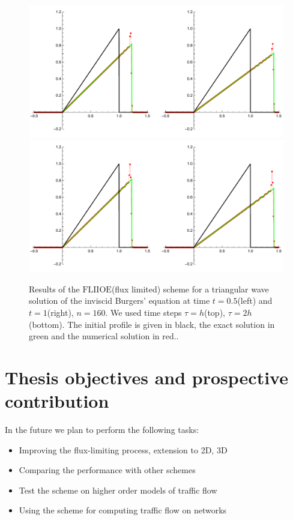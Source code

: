 \documentclass[../include.tex]{subfiles}
\begin{document}
\begin{figure}[H]
	\centering
	\includegraphics[width=\textwidth]{figures/inviscidTriang160c1}
	\includegraphics[width=\textwidth]{figures/inviscidTriang160c2}
	\caption{Results of the $\mathrm{FLIIOE}$(flux limited) scheme for a triangular wave solution of the inviscid Burgers' equation at time $ t=0.5 $(left) and $ t=1 $(right), $ n=160 $. We used time steps $ \tau=h $(top), $ \tau=2h $(bottom). The initial profile is given in black, the exact solution in green and the numerical solution in red..}
	\label{fig:fliioe_burg_triang}
\end{figure}
\chapter{Thesis objectives and prospective contribution}
In the future we plan to perform the following tasks:
\begin{itemize}
	\item Improving the flux-limiting process, extension to 2D, 3D
	\item Comparing the performance with other schemes
	\item Test the scheme on higher order models of traffic flow
	\item Using the scheme for computing traffic flow on networks
\end{itemize}
\end{document}
